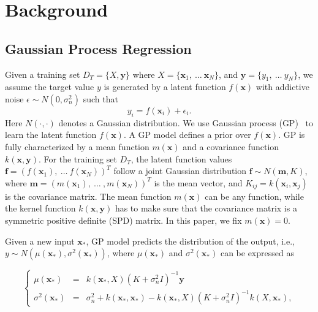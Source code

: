 \section{Background}\label{sec:Background}

\subsection{Gaussian Process Regression}\label{sec:SOGP}

Given a training set $D_T = \{X, \bm{y}\}$ where $X = \{\bm{x}_1,~\dots~\bm{x}_N\}$, and $\bm{y} = \{y_1,~\dots~y_N\}$, we assume the target value $y$ is generated
by a latent function $f(\bm{x})$ with addictive noise $\epsilon \sim N(0, \sigma_n^2)$ such that
\begin{equation}
    \label{eq:yf}
    y_i = f(\bm{x}_i) + \epsilon_i.
\end{equation}
Here $N(\cdot, \cdot)$ denotes a Gaussian distribution. We use Gaussian process (GP)~\cite{GPML} to learn the latent function $f(\bm{x})$. A GP model defines a prior over $f(\bm{x})$. GP is fully characterized by a mean function $m(\bm{x})$ and a covariance function $k(\bm{x}, \bm{y})$. For the training set $D_T$, the latent function values $\bm{f} = (f(\bm{x}_1),~\dots~f(\bm{x}_N))^T$ follow a joint Gaussian distribution $\bm{f} \sim N(\bm{m}, K)$, where $\bm{m} = (m(\bm{x}_1),~\dots~,m(\bm{x}_N))^T$ is the mean vector, and $K_{ij} = k(\bm{x}_i, \bm{x}_j)$ is the covariance matrix. The mean function $m(\bm{x})$ can be any function, while the kernel function $k(\bm{x}, \bm{y})$ has to make sure that the covariance matrix is a symmetric positive definite (SPD) matrix. In this paper, we fix $m(\bm{x}) = 0$.

Given a new input $\bm{x}_*$, GP model predicts the distribution of the output, i.e., $y \sim N(\mu(\bm{x}_*), \sigma^2(\bm{x}_*))$, where $\mu(\bm{x}_*)$ and $\sigma^2(\bm{x}_*)$ can be expressed as

\begin{equation}
    \left\{
        \begin{array}{lll}
            \mu(\bm{x}_*)      &=& k(\bm{x}_*, X) (K + \sigma_n^2 I)^{-1} \bm{y} \\
            \sigma^2(\bm{x}_*) &=& \sigma_n^2 + k(\bm{x}_*, \bm{x}_*) - k(\bm{x}_*, X) (K + \sigma_n^2 I)^{-1} k(X, \bm{x}_*),
        \end{array}
    \right.
    \label{eq:GPRPred}
\end{equation}

